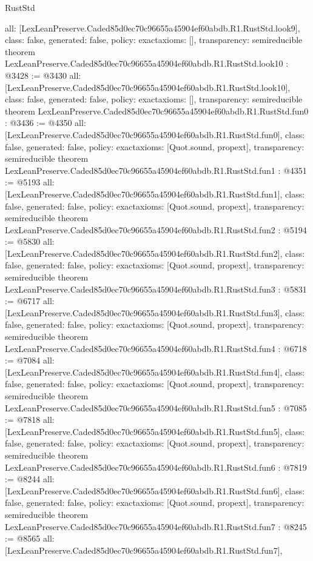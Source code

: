 \begin{lexlean}{RustStd}
\begin{coremodule}
{  all: [LexLeanPreserve.Caded85d0ec70c96655a45904ef60abdb.R1.RustStd.look9],
  class: false,
  generated: false,
  policy: exact{axioms: []},
  transparency: semireducible
}
theorem LexLeanPreserve.Caded85d0ec70c96655a45904ef60abdb.R1.RustStd.look10 : @3428 := @3430 {
  all: [LexLeanPreserve.Caded85d0ec70c96655a45904ef60abdb.R1.RustStd.look10],
  class: false,
  generated: false,
  policy: exact{axioms: []},
  transparency: semireducible
}
theorem LexLeanPreserve.Caded85d0ec70c96655a45904ef60abdb.R1.RustStd.fun0 : @3436 := @4350 {
  all: [LexLeanPreserve.Caded85d0ec70c96655a45904ef60abdb.R1.RustStd.fun0],
  class: false,
  generated: false,
  policy: exact{axioms: [Quot.sound, propext]},
  transparency: semireducible
}
theorem LexLeanPreserve.Caded85d0ec70c96655a45904ef60abdb.R1.RustStd.fun1 : @4351 := @5193 {
  all: [LexLeanPreserve.Caded85d0ec70c96655a45904ef60abdb.R1.RustStd.fun1],
  class: false,
  generated: false,
  policy: exact{axioms: [Quot.sound, propext]},
  transparency: semireducible
}
theorem LexLeanPreserve.Caded85d0ec70c96655a45904ef60abdb.R1.RustStd.fun2 : @5194 := @5830 {
  all: [LexLeanPreserve.Caded85d0ec70c96655a45904ef60abdb.R1.RustStd.fun2],
  class: false,
  generated: false,
  policy: exact{axioms: [Quot.sound, propext]},
  transparency: semireducible
}
theorem LexLeanPreserve.Caded85d0ec70c96655a45904ef60abdb.R1.RustStd.fun3 : @5831 := @6717 {
  all: [LexLeanPreserve.Caded85d0ec70c96655a45904ef60abdb.R1.RustStd.fun3],
  class: false,
  generated: false,
  policy: exact{axioms: [Quot.sound, propext]},
  transparency: semireducible
}
theorem LexLeanPreserve.Caded85d0ec70c96655a45904ef60abdb.R1.RustStd.fun4 : @6718 := @7084 {
  all: [LexLeanPreserve.Caded85d0ec70c96655a45904ef60abdb.R1.RustStd.fun4],
  class: false,
  generated: false,
  policy: exact{axioms: [Quot.sound, propext]},
  transparency: semireducible
}
theorem LexLeanPreserve.Caded85d0ec70c96655a45904ef60abdb.R1.RustStd.fun5 : @7085 := @7818 {
  all: [LexLeanPreserve.Caded85d0ec70c96655a45904ef60abdb.R1.RustStd.fun5],
  class: false,
  generated: false,
  policy: exact{axioms: [Quot.sound, propext]},
  transparency: semireducible
}
theorem LexLeanPreserve.Caded85d0ec70c96655a45904ef60abdb.R1.RustStd.fun6 : @7819 := @8244 {
  all: [LexLeanPreserve.Caded85d0ec70c96655a45904ef60abdb.R1.RustStd.fun6],
  class: false,
  generated: false,
  policy: exact{axioms: [Quot.sound, propext]},
  transparency: semireducible
}
theorem LexLeanPreserve.Caded85d0ec70c96655a45904ef60abdb.R1.RustStd.fun7 : @8245 := @8565 {
  all: [LexLeanPreserve.Caded85d0ec70c96655a45904ef60abdb.R1.RustStd.fun7],
}
\end{coremodule}
\end{lexlean}
